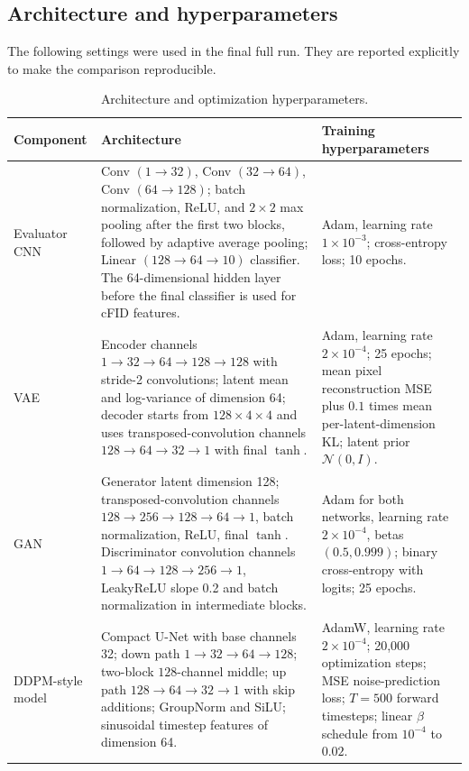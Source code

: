 \documentclass[11pt]{article}
\begin{document}
\subsection{Architecture and hyperparameters}

The following settings were used in the final full run. They are reported explicitly to make the comparison reproducible.

\begin{table}[H]
\centering
\scriptsize
\caption{Architecture and optimization hyperparameters.}
\begin{tabular}{p{}p{}p{}}
\toprule
\textbf{Component} & \textbf{Architecture} & \textbf{Training hyperparameters}\\
\midrule
Evaluator CNN &
Conv $(1\rightarrow32)$, Conv $(32\rightarrow64)$, Conv $(64\rightarrow128)$; batch normalization, ReLU, and $2\times2$ max pooling after the first two blocks, followed by adaptive average pooling; Linear $(128\rightarrow64\rightarrow10)$ classifier. The 64-dimensional hidden layer before the final classifier is used for cFID features. &
Adam, learning rate $1\times10^{-3}$; cross-entropy loss; 10 epochs.\\
\midrule
VAE &
Encoder channels $1\rightarrow32\rightarrow64\rightarrow128\rightarrow128$ with stride-2 convolutions; latent mean and log-variance of dimension 64; decoder starts from $128\times4\times4$ and uses transposed-convolution channels $128\rightarrow64\rightarrow32\rightarrow1$ with final $\tanh$. &
Adam, learning rate $2\times10^{-4}$; 25 epochs; mean pixel reconstruction MSE plus $0.1$ times mean per-latent-dimension KL; latent prior $\mathcal{N}(0,I)$.\\
\midrule
GAN &
Generator latent dimension 128; transposed-convolution channels $128\rightarrow256\rightarrow128\rightarrow64\rightarrow1$, batch normalization, ReLU, final $\tanh$. Discriminator convolution channels $1\rightarrow64\rightarrow128\rightarrow256\rightarrow1$, LeakyReLU slope 0.2 and batch normalization in intermediate blocks. &
Adam for both networks, learning rate $2\times10^{-4}$, betas $(0.5,0.999)$; binary cross-entropy with logits; 25 epochs.\\
\midrule
DDPM-style model &
Compact U-Net with base channels 32; down path $1\rightarrow32\rightarrow64\rightarrow128$; two-block $128$-channel middle; up path $128\rightarrow64\rightarrow32\rightarrow1$ with skip additions; GroupNorm and SiLU; sinusoidal timestep features of dimension 64. &
AdamW, learning rate $2\times10^{-4}$; 20,000 optimization steps; MSE noise-prediction loss; $T=500$ forward timesteps; linear $\beta$ schedule from $10^{-4}$ to $0.02$.\\
\bottomrule
\end{tabular}
\end{table}
\end{document}
